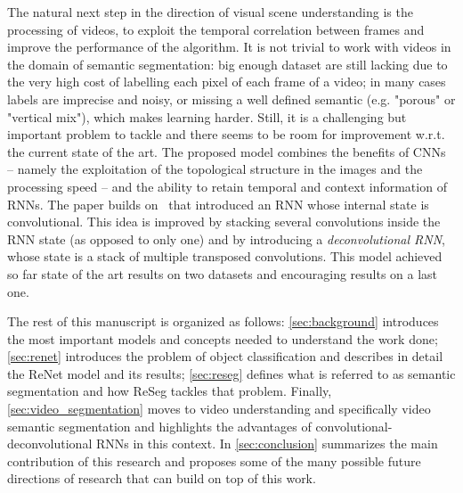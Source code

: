 The natural next step in the direction of visual scene understanding is the
processing of videos, to exploit the temporal correlation between frames and
improve the performance of the algorithm. It is not trivial to work with videos
in the domain of semantic segmentation: big enough dataset are still lacking
due to the very high cost of labelling each pixel of each frame of a video; in
many cases labels are imprecise and noisy, or missing a well defined semantic
(e.g. "porous" or "vertical mix"), which makes learning harder. Still, it is
a challenging but important problem to tackle and there seems to be room for
improvement w.r.t. the current state of the art. The proposed model combines
the benefits of CNNs -- namely the exploitation of the topological structure in
the images and the processing speed -- and the ability to retain temporal and
context information of RNNs. The paper builds
on~\cite{xingjian2015convolutional} that introduced an RNN whose internal state
is convolutional. This idea is improved by stacking several convolutions inside
the RNN state (as opposed to only one) and by introducing a
\emph{deconvolutional RNN}, whose state is a stack of multiple transposed
convolutions. This model achieved so far state of the art results on two
datasets and encouraging results on a last one.


The rest of this manuscript is organized as follows: \autoref{sec:background}
introduces the most important models and concepts needed to understand the work
done; \autoref{sec:renet} introduces the problem of object classification and
describes in detail the ReNet model and its results; \autoref{sec:reseg}
defines what is referred to as semantic segmentation and how ReSeg tackles that
problem. Finally, \autoref{sec:video_segmentation} moves to video understanding
and specifically video semantic segmentation and highlights the advantages of
convolutional-deconvolutional RNNs in this context. In
\autoref{sec:conclusion} summarizes the main contribution of this research and
proposes some of the many possible future directions of research that can build
on top of this work.

